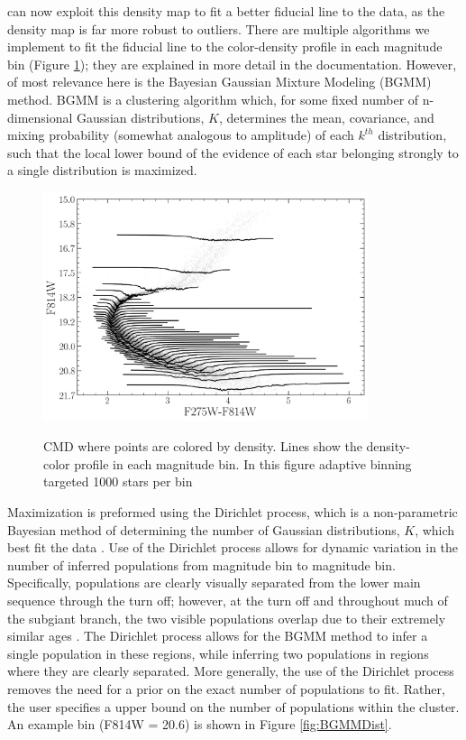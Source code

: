 \fidanka can now exploit this density map to fit a better fiducial line to the
data, as the density map is far more robust to outliers. There are multiple
algorithms we implement to fit the fiducial line to the color-density profile
in each magnitude bin (Figure \ref{fig:densityBinsDemo}); they are explained in more detail in the \fidanka
documentation. However, of most relevance here is the Bayesian Gaussian Mixture
Modeling (BGMM) method. BGMM is a clustering algorithm which, for some fixed
number of n-dimensional Gaussian distributions, $K$, determines the mean, covariance, and
mixing probability (somewhat analogous to amplitude) of each $k^{th}$
distribution, such that the local lower bound of the evidence of each star
belonging strongly to a single distribution is maximized. 

\begin{figure}
	\centering
	\includegraphics[width=0.85\textwidth]{figures/ngc2808/notebookFigures/DensityBinsDemo.png}
	\label{fig:densityBinsDemo}
	\caption{CMD where points are colored by density. Lines show the
	density-color profile in each magnitude bin. In this figure adaptive
	binning targeted 1000 stars per bin}
\end{figure}

Maximization is preformed using the Dirichlet process, which is a
non-parametric Bayesian method of determining the number of Gaussian distributions, $K$,
which best fit the data \citep{Ferguson1973, scikit-learn}. Use of the Dirichlet process
allows for dynamic variation in the number of inferred populations from
magnitude bin to magnitude bin. Specifically, populations are clearly visually
separated from the lower main sequence through the turn off; however, at the
turn off and throughout much of the subgiant branch, the two visible
populations overlap due to their extremely similar ages \citep[i.e.][]{Jordan2002}. The Dirichlet process allows for the BGMM method to infer a single
population in these regions, while inferring two populations in regions where
they are clearly separated. More generally, the use of the Dirichlet process
removes the need for a prior on the exact number of populations to fit. Rather,
the user specifies a upper bound on the number of populations within the
cluster. An example bin (F814W = 20.6) is shown in Figure \ref{fig:BGMMDist}.

